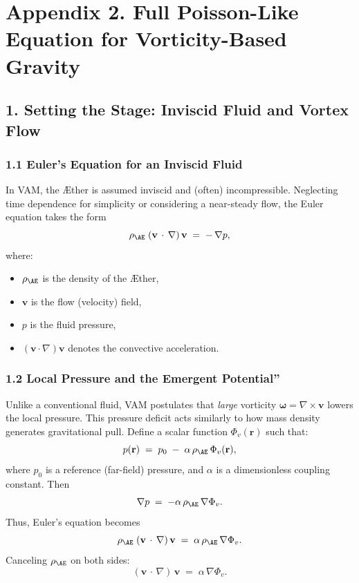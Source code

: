 \documentclass[a4paper,12pt]{article}
\begin{document}
\section*{Appendix 2. Full Poisson-Like Equation for Vorticity-Based Gravity}

\subsection*{1. Setting the Stage: Inviscid Fluid and Vortex Flow}

\subsubsection*{1.1 Euler's Equation for an Inviscid Fluid}
In VAM, the Æther is assumed inviscid and (often) incompressible. Neglecting time dependence for simplicity or considering a near-steady flow, the Euler equation takes the form
\[
    \rho_{\mathrm{\AE}}\;(\mathbf{v}\,\cdot\,\nabla)\,\mathbf{v}
    \;=\;
    -\,\nabla p,
\]
where:
\begin{itemize}
    \item \(\rho_{\mathrm{\AE}}\) is the density of the Æther,
    \item \(\mathbf{v}\) is the flow (velocity) field,
    \item \(p\) is the fluid pressure,
    \item \((\mathbf{v}\cdot\nabla)\mathbf{v}\) denotes the convective acceleration.
\end{itemize}

\subsubsection*{1.2 Local Pressure and the Emergent \grqq Potential\textquotedblright}
Unlike a conventional fluid, VAM postulates that \textit{large} vorticity \(\boldsymbol{\omega} = \nabla \times \mathbf{v}\) lowers the local pressure. This pressure deficit acts similarly to how mass density generates gravitational pull. Define a scalar function \(\Phi_v(\mathbf{r})\) such that:
\[
    p(\mathbf{r})
    \;=\;
    p_0 \;-\; \alpha \,\rho_{\mathrm{\AE}}\,\Phi_v(\mathbf{r}),
\]
where \(p_0\) is a reference (far-field) pressure, and \(\alpha\) is a dimensionless coupling constant. Then
\[
    \nabla p
    \;=\;
    -\alpha \,\rho_{\mathrm{\AE}} \,\nabla \Phi_v.
\]
Thus, Euler's equation becomes
\[
    \rho_{\mathrm{\AE}}\;(\mathbf{v}\,\cdot\,\nabla)\,\mathbf{v}
    \;=\;
    \alpha\,\rho_{\mathrm{\AE}}\,\nabla \Phi_v.
\]
Canceling \(\rho_{\mathrm{\AE}}\) on both sides:
\[
    (\mathbf{v}\,\cdot\,\nabla)\,\mathbf{v}
    \;=\;
    \alpha\,\nabla \Phi_v.
    \tag{1}
\]
\end{document}
